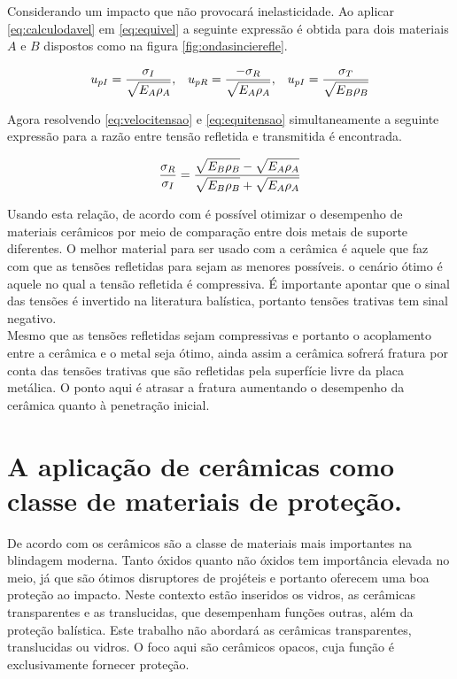 Considerando um impacto que não provocará inelasticidade. Ao aplicar \ref{eq:calculodavel} em \ref{eq:equivel} a seguinte expressão é obtida para dois materiais $A$  e  $B$ dispostos como na figura \ref{fig:ondasincierefle}.

\begin{align} \label{eq:velocitensao}
    u_{pI} = \frac{\displaystyle \sigma_I}{\displaystyle \sqrt{E_A\rho_A}}, && u_{pR} = \frac{\displaystyle -\sigma_R}{\displaystyle \sqrt{E_A\rho_A}}, && u_{pI} = \frac{\displaystyle \sigma_T}{\displaystyle \sqrt{E_B\rho_B}}
\end{align}
 
  
 Agora resolvendo \ref{eq:velocitensao} e \ref{eq:equitensao} simultaneamente a seguinte expressão para a razão entre tensão refletida e transmitida é encontrada.
 
 \begin{equation}
     \frac{\displaystyle \sigma_R}{\displaystyle \sigma_I} = \frac{\displaystyle \sqrt{E_B \rho_B} - \sqrt{E_A \rho_A}}{\displaystyle \sqrt{E_B \rho_B} + \sqrt{E_A \rho_A}}
 \end{equation}
 
Usando esta relação, de acordo com \cite{Hazell} é possível otimizar o desempenho de materiais cerâmicos por meio de comparação entre dois metais de suporte diferentes. O melhor material para ser usado com a cerâmica é aquele que faz com que as tensões refletidas para sejam as menores possíveis. o cenário ótimo é aquele no qual a tensão refletida é compressiva. É importante apontar que o sinal das tensões é invertido na literatura balística, portanto tensões trativas tem sinal negativo. \\

Mesmo que as tensões refletidas sejam compressivas e portanto o acoplamento entre a cerâmica e o metal seja ótimo, ainda assim a cerâmica sofrerá fratura por conta das tensões trativas que são refletidas pela superfície livre da placa metálica. O ponto aqui é atrasar a fratura aumentando o desempenho da cerâmica quanto à penetração inicial.

\section{A aplicação de cerâmicas como classe de materiais de proteção.}

De acordo com \cite{Crouch} os cerâmicos são a classe de materiais mais importantes na blindagem moderna. Tanto óxidos quanto não óxidos tem importância elevada no meio, já que são ótimos disruptores de projéteis e portanto oferecem uma boa proteção ao impacto. Neste contexto estão inseridos os vidros, as cerâmicas transparentes e as translucidas, que desempenham funções outras, além da proteção balística. Este trabalho não abordará as cerâmicas transparentes, translucidas ou vidros. O foco aqui são cerâmicos opacos, cuja função é exclusivamente fornecer proteção.\\

